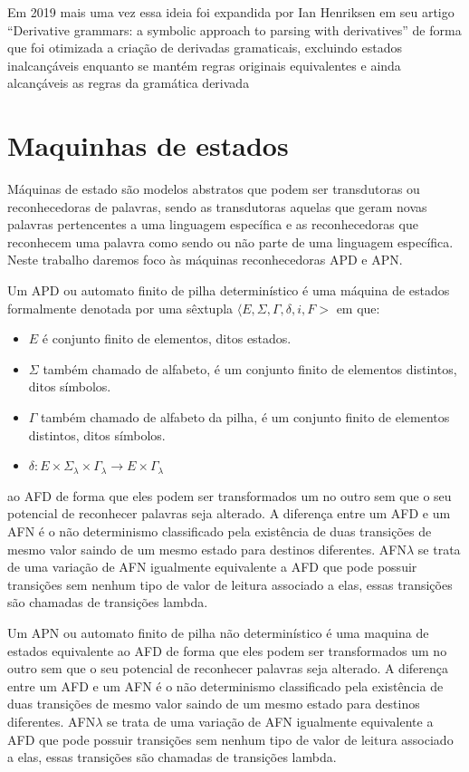 Em 2019 mais uma vez essa ideia foi expandida por Ian Henriksen em seu artigo “Derivative grammars: a symbolic approach to parsing with derivatives” de forma que foi otimizada a criação de derivadas gramaticais, excluindo estados inalcançáveis enquanto se mantém regras originais equivalentes e ainda alcançáveis as regras da gramática derivada 

\section{Maquinhas de estados}

Máquinas de estado são modelos abstratos que podem ser transdutoras ou reconhecedoras de palavras, sendo as transdutoras aquelas que geram novas palavras pertencentes a uma linguagem específica e as reconhecedoras que reconhecem uma palavra como sendo ou não parte de uma linguagem específica. Neste trabalho daremos foco às máquinas reconhecedoras APD e APN.

Um APD ou automato finito de pilha determinístico é uma máquina de estados formalmente denotada por uma sêxtupla 
$\langle E,\Sigma, \Gamma, \delta,i,F>$ em que: 

\begin{itemize}
     \item $E$ é conjunto finito de elementos, ditos estados. 
     \item $\Sigma$ também chamado de alfabeto, é um conjunto finito de elementos distintos, ditos símbolos.  
     \item $\Gamma$ também chamado de alfabeto da pilha, é um conjunto finito de elementos distintos, ditos símbolos.
     \item  $\delta : E \times \Sigma_\lambda \times \Gamma_\lambda \to E \times \Gamma_\lambda  $               
     
\end{itemize}


ao AFD de forma que eles podem ser transformados um no outro sem que o seu potencial de reconhecer palavras seja alterado. A diferença entre um AFD e um AFN é o não determinismo classificado pela existência de duas transições de mesmo valor saindo de um mesmo estado para destinos diferentes. AFN$\lambda$ se trata de uma variação de AFN igualmente equivalente a AFD que pode possuir transições sem nenhum tipo de valor de leitura associado a elas, essas transições são chamadas de transições lambda.


Um APN ou automato finito de pilha não determinístico é uma maquina de estados equivalente ao AFD de forma que eles podem ser transformados um no outro sem que o seu potencial de reconhecer palavras seja alterado. A diferença entre um AFD e um AFN é o não determinismo classificado pela existência de duas transições de mesmo valor saindo de um mesmo estado para destinos diferentes. AFN$\lambda$ se trata de uma variação de AFN igualmente equivalente a AFD que pode possuir transições sem nenhum tipo de valor de leitura associado a elas, essas transições são chamadas de transições lambda.

